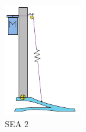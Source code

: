 \begin{figure}[hb!]
\begin{subfigure}{.19\textwidth}
    \includegraphics[width=\linewidth]{figures/illustration_serial_pulley.pdf}
    \caption{SEA 2}
    \label{fig:series2}
  \end{subfigure}
  \begin{subfigure}{.19\textwidth}
    \centering

\end{subfigure}
\end{figure}
